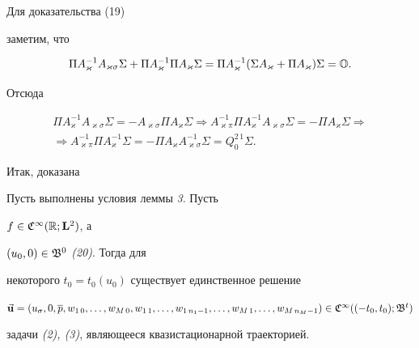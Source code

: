 Для доказательства (19)


заметим, что


$$


\Pi A^{-1}_\varkappa A_{\varkappa\sigma}\Sigma+


\Pi A^{-1}_\varkappa\Pi A_\varkappa\Sigma=


\Pi A^{-1}_\varkappa(\Sigma A_\varkappa +


\Pi A_\varkappa)\Sigma=\bo.


$$


Отсюда


\begin{multline*}


\Pi A^{-1}_\varkappa A_{\varkappa\sigma}\Sigma=


-A_{\varkappa\sigma}\Pi A_\varkappa\Sigma\Longrightarrow


A^{-1}_{\varkappa\pi}\Pi A^{-1}_\varkappa


A_{\varkappa\sigma}\Sigma= -\Pi A_\varkappa\Sigma \Longrightarrow\\


\Longrightarrow A^{-1}_{\varkappa\pi}\Pi A^{-1}_\varkappa\Sigma=


-\Pi A_\varkappa A^{-1}_{\varkappa\sigma}\Sigma


=Q^{2\,1}_0\Sigma.


\end{multline*}





Итак, доказана





\begin{thm} Пусть выполнены условия леммы {\em 3}. Пусть


$f\in\frak C^\infty(\Bbb R;\bold L^2)$, а


$(u_0,0)\in\frak B^0$ {\em (20)}. Тогда для


некоторого $t_0=t_0(u_0)$ существует единственное решение


$\Vec{\bold u}=(u_\sigma,0,\overline p,


w_{1\,0},\dotsc,w_{M\,0},\linebreak w_{1\,1},\dotsc,w_{1\,n_1-1},\dotsc,


w_{M\,1},\dotsc,w_{M\,n_M-1})\in


\frak C^\infty((-t_0,t_0);\frak B^t)$


задачи {\em (2), (3)}, являющееся квазистационарной траекторией.


\end{thm}





